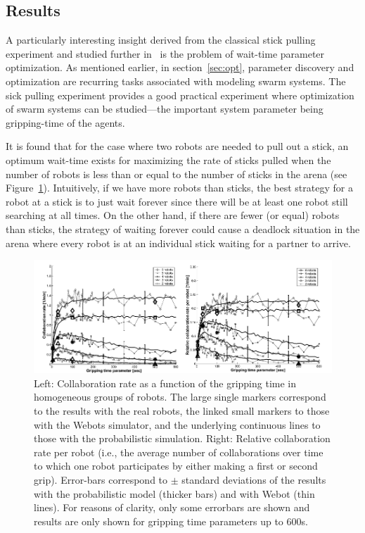 \documentclass[Main.tex]{subfiles}
\begin{document}
\subsection*{Results}
A particularly interesting insight derived from the classical stick pulling experiment and studied further in~\citep{Ijspeert2001} is the problem of wait-time parameter optimization. As mentioned earlier, in section~\ref{sec:opt}, parameter discovery and optimization are recurring tasks associated with modeling swarm systems. The sick pulling experiment provides a good practical experiment where optimization of swarm systems can be studied---the important system parameter being gripping-time of the agents.

It is found that for the case where two robots are needed to pull out a stick, an optimum wait-time exists for maximizing the rate of sticks pulled when the number of robots is less than or equal to the number of sticks in the arena (see Figure~\ref{fig:stickopt}). Intuitively, if we have more robots than sticks, the best strategy for a robot at a stick is to just wait forever since there will be at least one robot still searching at all times. On the other hand, if there are fewer (or equal) robots than sticks, the strategy of waiting forever could cause a deadlock situation in the arena where every robot is at an individual stick waiting for a partner to arrive.

\begin{figure}[!ht]
\centering\includegraphics[width=.85\textwidth]{assets/stickopt.png}
\centering\caption{Left: Collaboration rate as a function of the gripping time in homogeneous groups of robots. The large single markers correspond to the results with the real robots, the linked small markers to those with the Webots simulator, and the underlying continuous lines to those with the probabilistic simulation. Right: Relative collaboration rate per robot (i.e., the average number of collaborations over time to which one robot participates by either making a first or second grip). Error-bars correspond to $\pm$ standard deviations of the results with the probabilistic model (thicker bars) and with Webot (thin lines). For reasons of clarity, only some errorbars are shown and results are only shown for gripping time parameters up to 600s.}\label{fig:stickopt}
\end{figure}
\end{document}
